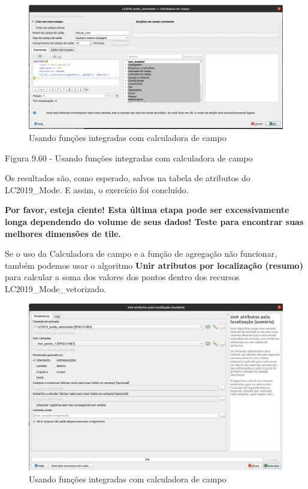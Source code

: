 \documentclass[
]{krantz}
\begin{document}
\begin{figure}
\centering
\includegraphics{media/modulo9/fig960.png}
\caption{Usando funções integradas com calculadora de campo}
\end{figure}

Figura 9.60 - Usando funções integradas com calculadora de campo

Os resultados são, como esperado, salvos na tabela de atributos do LC2019\_Mode. E assim, o exercício foi concluído.

\textbf{Por favor, esteja ciente! Esta última etapa pode ser excessivamente longa dependendo do volume de seus dados! Teste para encontrar suas melhores dimensões de tile.}

Se o uso da Calculadora de campo e a função de agregação não funcionar, também podemos usar o algoritmo \textbf{Unir atributos por localização (resumo)} para calcular a soma dos valores dos pontos dentro dos recursos LC2019\_Mode\_vetorizado.

\begin{figure}
\centering
\includegraphics{media/modulo9/fig961.png}
\caption{Usando funções integradas com calculadora de campo}
\end{figure}
\end{document}

